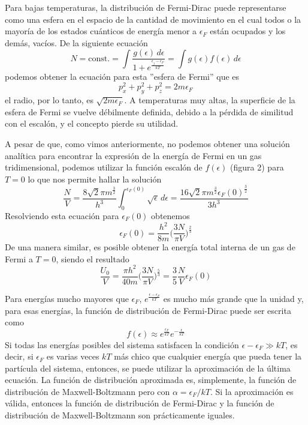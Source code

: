 \documentclass[12pt,a4paper]{article}
\def\e{{\epsilon}} %
\begin{document}
Para bajas temperaturas, la distribución de Fermi-Dirac puede representarse como una esfera en el espacio de la cantidad de movimiento en el cual todos o la mayoría de los estados cuánticos de energía menor a $\e_{F}$ están ocupados y los demás, vacíos. De la siguiente ecuación
\[ N=\textrm{const.}=\int \frac{g(\e)\,d\e}{1+e^{\frac{\e_{j}-\e_{F}}{kT}}}=\int g(\e)f(\e) \, d\e \]
podemos obtener la ecuación para esta ''esfera de Fermi'' que es
\[ p_{x}^{2}+p_{y}^{2}+p_{z}^{2}=2m\e_{F} \]
el radio, por lo tanto, es $\sqrt{2m\e_{F}}$. A temperaturas muy altas, la superficie de la esfera de Fermi se vuelve débilmente definida, debido a la pérdida de similitud con el escalón, y el concepto pierde su utilidad.

A pesar de que, como vimos anteriormente, no podemos obtener una solución analítica para encontrar la expresión de la energía de Fermi en un gas tridimensional, podemos utilizar la función escalón de $f(\e)$ (figura 2) para $T=0$ lo que nos permite hallar la solución
\[ \frac{N}{V}=\frac{8 \sqrt{2} \pi m^{\frac{3}{2}}}{h^{3}} \int _{0}^{\e_{F}(0)} \sqrt{\e} \, d\e=\frac{16 \sqrt{2} \pi m^{\frac{3}{2}}\e_{F}(0)^{\frac{3}{2}}}{3h^{3}} \]
Resolviendo esta ecuación para $\e_{F}(0)$ obtenemos
\[ \e_{F}(0)=\frac{h^{2}}{8m} \bigg( \frac{3N}{\pi V} \bigg)^{\frac{2}{3}} \]
De una manera similar, es posible obtener la energía total interna de un gas de Fermi a $T=0$, siendo el resultado
\[ \frac{U_{0}}{V} = \frac{\pi h^{2}}{40m} \bigg( \frac{3N}{\pi V} \bigg)^{\frac{5}{3}}=\frac{3}{5} \frac{N}{V} \e_{F}(0) \]

Para energías mucho mayores que $\e_{F}$, $e^{\frac{\e-\e_{F}}{kT}}$ es mucho más grande que la unidad y, para esas energías, la función de distribución de Fermi-Dirac puede ser escrita como
\[ f(\e) \approx e^{\frac{\e_{F}}{kT}}e^{-\frac{\e}{kT}} \]
Si todas las energías posibles del sistema satisfacen la condición $\e - \e_{F} \gg kT$, es decir, si $\e_{F}$ es varias veces $kT$ más chico que cualquier energía que pueda tener la partícula del sistema, entonces, se puede utilizar la aproximación de la última ecuación. La función de distribución aproximada es, simplemente, la función de distribución de Maxwell-Boltzmann pero con $\alpha=\e_{F}/kT$. Si la aproximación es válida, entonces la función de distribución de Fermi-Dirac y la función de distribución de Maxwell-Boltzmann son prácticamente iguales.
\end{document}
